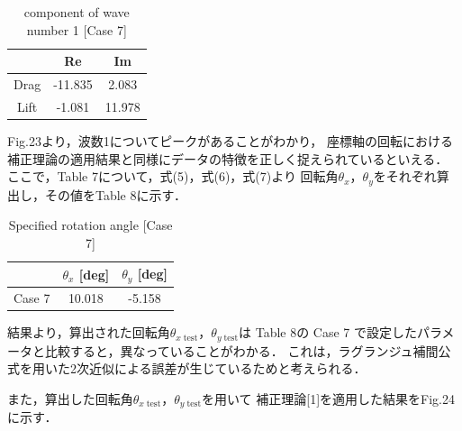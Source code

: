 \begin{table}[htbp]
  \begin{center}
    \caption{component of wave number 1 [Case 7]}
    \begin{tabular}{|p{30mm}|p{20mm}|p{20mm}|}
      \hline
      \multicolumn{1}{|c|}{}     & \multicolumn{1}{|c|}{Re}      & \multicolumn{1}{|c|}{Im}     \\ \hline
      \multicolumn{1}{|c|}{Drag} & \multicolumn{1}{|c|}{-11.835} & \multicolumn{1}{|c|}{2.083}  \\ \hline
      \multicolumn{1}{|c|}{Lift} & \multicolumn{1}{|c|}{-1.081}  & \multicolumn{1}{|c|}{11.978} \\ \hline
    \end{tabular}
  \end{center}
\end{table}

\newpage
Fig.23より，波数1についてピークがあることがわかり，
座標軸の回転における補正理論の適用結果と同様にデータの特徴を正しく捉えられているといえる．
ここで，Table 7について，式(5)，式(6)，式(7)より
回転角$\theta_x$，$\theta_y$をそれぞれ算出し，その値をTable 8に示す．

\begin{table}[htbp]
  \begin{center}
    \caption{Specified rotation angle [Case 7]}
    \begin{tabular}{|p{30mm}|p{20mm}|p{20mm}|}
      \hline
      \multicolumn{1}{|c|}{}       & \multicolumn{1}{|c|}{$\theta_x$ [deg]} & \multicolumn{1}{|c|}{$\theta_y$ [deg]} \\ \hline
      \multicolumn{1}{|c|}{Case 7} & \multicolumn{1}{|c|}{10.018}           & \multicolumn{1}{|c|}{-5.158}           \\ \hline
    \end{tabular}
  \end{center}
\end{table}


結果より，算出された回転角$\theta_{x\;\mathrm{test}}$，$\theta_{y\;\mathrm{test}}$は
Table 8の Case 7 で設定したパラメータと比較すると，異なっていることがわかる．
これは，ラグランジュ補間公式を用いた2次近似による誤差が生じているためと考えられる．

また，算出した回転角$\theta_{x\;\mathrm{test}}$，$\theta_{y\;\mathrm{test}}$を用いて
補正理論[1]を適用した結果をFig.24に示す．

